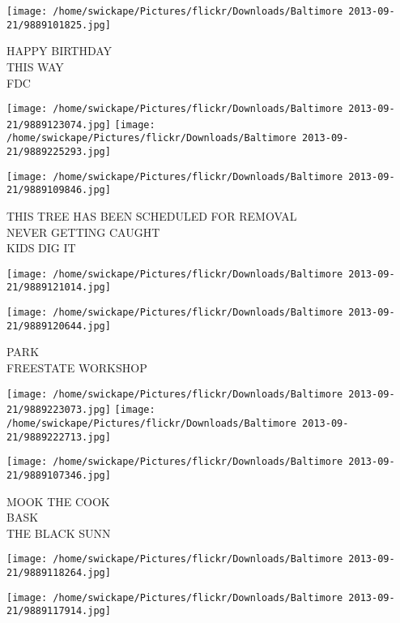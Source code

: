 \documentclass[10pt,letterpaper]{article}
\begin{document}
\vspace{0.25in}
\texttt{[image: /home/swickape/Pictures/flickr/Downloads/Baltimore 2013-09-21/9889101825.jpg]}

HAPPY BIRTHDAY\\
THIS WAY\\
FDC\\
\pagebreak

\texttt{[image: /home/swickape/Pictures/flickr/Downloads/Baltimore 2013-09-21/9889123074.jpg]}
\texttt{[image: /home/swickape/Pictures/flickr/Downloads/Baltimore 2013-09-21/9889225293.jpg]}

\texttt{[image: /home/swickape/Pictures/flickr/Downloads/Baltimore 2013-09-21/9889109846.jpg]}

THIS TREE HAS BEEN SCHEDULED FOR REMOVAL\\
NEVER GETTING CAUGHT\\
KIDS DIG IT\\
\pagebreak

\texttt{[image: /home/swickape/Pictures/flickr/Downloads/Baltimore 2013-09-21/9889121014.jpg]}

\vspace{0.25in}
\texttt{[image: /home/swickape/Pictures/flickr/Downloads/Baltimore 2013-09-21/9889120644.jpg]}

PARK\\
FREESTATE WORKSHOP\\
\pagebreak

\texttt{[image: /home/swickape/Pictures/flickr/Downloads/Baltimore 2013-09-21/9889223073.jpg]}
\texttt{[image: /home/swickape/Pictures/flickr/Downloads/Baltimore 2013-09-21/9889222713.jpg]}

\texttt{[image: /home/swickape/Pictures/flickr/Downloads/Baltimore 2013-09-21/9889107346.jpg]}

MOOK THE COOK\\
BASK\\
THE BLACK SUNN\\
\pagebreak

\texttt{[image: /home/swickape/Pictures/flickr/Downloads/Baltimore 2013-09-21/9889118264.jpg]}

\vspace{0.25in}
\texttt{[image: /home/swickape/Pictures/flickr/Downloads/Baltimore 2013-09-21/9889117914.jpg]}
\end{document}
